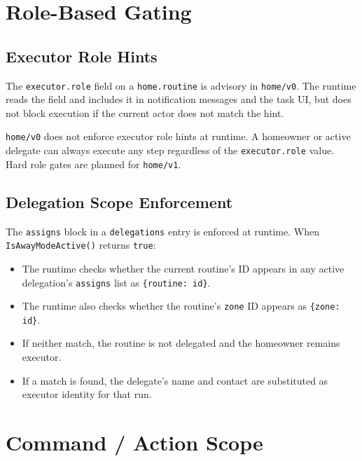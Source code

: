 \section{Role-Based Gating}
\label{sec:integration-role-gating}

\subsection{Executor Role Hints}

The \texttt{executor.role} field on a \texttt{home.routine} is advisory in
\texttt{home/v0}. The runtime reads the field and includes it in notification messages and
the task UI, but does not block execution if the current actor does not match the hint.

\begin{tcolorbox}[colback=yellow!10,colframe=orange!70,title=Note]
  \texttt{home/v0} does not enforce executor role hints at runtime. A homeowner or active
  delegate can always execute any step regardless of the \texttt{executor.role} value. Hard
  role gates are planned for \texttt{home/v1}.
\end{tcolorbox}

\subsection{Delegation Scope Enforcement}

The \texttt{assigns} block in a \texttt{delegations} entry is enforced at runtime.
When \texttt{IsAwayModeActive()} returns \texttt{true}:

\begin{itemize}
  \item The runtime checks whether the current routine's ID appears in any active
        delegation's \texttt{assigns} list as \texttt{\{routine: id\}}.
  \item The runtime also checks whether the routine's \texttt{zone} ID appears as
        \texttt{\{zone: id\}}.
  \item If neither match, the routine is not delegated and the homeowner remains executor.
  \item If a match is found, the delegate's name and contact are substituted as executor
        identity for that run.
\end{itemize}

\section{Command / Action Scope}
\label{sec:integration-commands}


